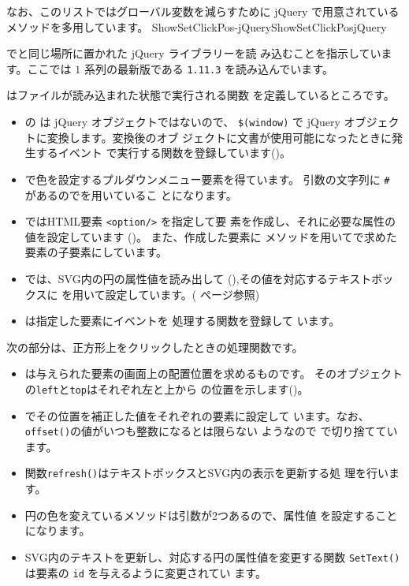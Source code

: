 なお、このリストではグローバル変数を減らすために jQuery で用意されている
メソッドを多用しています。
{}%
{ShowSetClickPos-jQuery}{ShowSetClickPosjQuery}

で\HTML と同じ場所に置かれた jQuery ライブラリーを読
			 み込むことを指示しています。ここでは $1$ 系列の最新版である
			 \texttt{1.11.3} を読み込んでいます。

はファイルが読み込まれた状態で実行される関数
を定義しているところです。
\begin{itemize}\upshape
 \item {}の は jQuery オブジェクトではないので、
			 \verb+$(window)+ で jQuery オブジェクトに変換します。変換後のオブ
			 ジェクトに文書が使用可能になったときに発生するイベント
			 で実行する関数を登録しています()。
 \item {}で色を設定するプルダウンメニュー要素を得ています。
			 引数の文字列に \verb+#+ があるのでを用いているこ
			 とになります。
 \item {}ではHTML要素 \verb+<option/>+ を指定して要
			 素を作成し、それに必要な属性の値を設定しています
			 ()。 また、作成した要素に
			 メソッドを用いてで求めた
			 要素の子要素にしています。
 \item {}では、SVG内の円の属性値を読み出して
			 (),その値を対応するテキストボックスに
			  を用いて設定しています。(\pageref{jQueryMethod}
			 ページ参照)
 \item {}は指定した要素にイベントを
			 処理する関数を登録して
			 います。
\end{itemize}
次の部分は、正方形上をクリックしたときの処理関数です。
\begin{itemize}\upshape
 \item {}は与えられた要素の画面上の配置位置を求めるものです。
			 そのオブジェクトの\texttt{left}と\texttt{top}はそれぞれ左と上から
			 の位置を示します()。
 \item {}でその位置を補正した値をそれぞれの要素に設定して
			 います。なお、\texttt{offset()}の値がいつも整数になるとは限らない
			 ようなので で切り捨てています。
\end{itemize}
\begin{itemize}\upshape
 \item 関数\texttt{refresh()}はテキストボックスとSVG内の表示を更新する処
			 理を行います。
 \item 円の色を変えているメソッドは引数が2つあるので、属性値
			 を設定することになります。
 \item SVG内のテキストを更新し、対応する円の属性値を変更する関数
			 \texttt{SetText()}は要素の \texttt{id} を与えるように変更されてい
			 ます。
\end{itemize}

